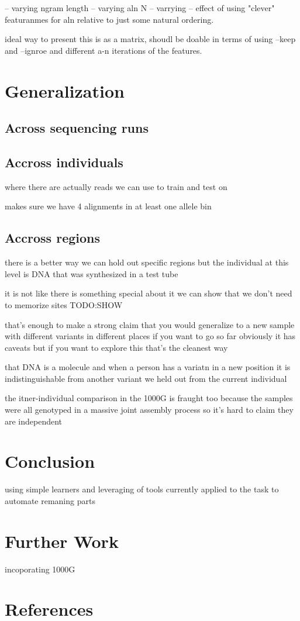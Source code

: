 \documentclass{article}
\begin{document}
-- varying ngram length
-- varying aln N
-- varrying 
-- effect of using "clever" featuranmes for aln relative to just some natural ordering.

ideal way to present this is as a matrix, shoudl be doable in terms of using --keep and --ignroe and different a-n iterations of the features.

\section{Generalization}

\subsection{Across sequencing runs}



\subsection{Accross individuals}
where there are actually reads we can use to train and test on


makes sure we have 4 alignments in at least one allele bin

\subsection{Accross regions}
there is a better way
we can hold out specific regions
but the individual
at this level
is DNA that was synthesized in a test tube

it is not like there is something special about it
we can show that we don't need to memorize sites
TODO:SHOW

that's enough to make a strong claim that you would generalize to a new sample with different variants in different places
if you want to go so far
obviously it has caveats but if you want to explore this that's the cleanest way

that DNA is a molecule and when a person has a variatn in a new position it is indistinguishable from another variant we held out from the current individual

the itner-individual comparison in the 1000G is fraught too
because the samples were all genotyped in a massive joint assembly process
so it's hard to claim they are independent

\section{Conclusion}

using simple learners and leveraging of tools currently applied to the task to automate remaning parts


\section{Further Work}
incoporating 1000G

\section*{References}
\small



\end{document}
